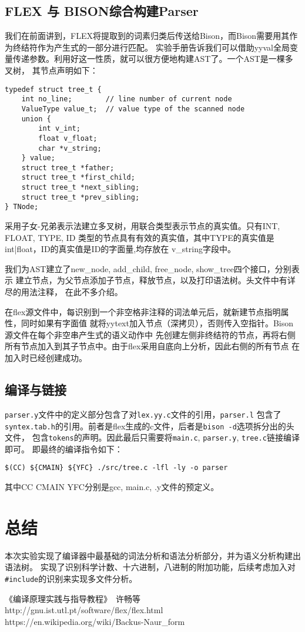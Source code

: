 \documentclass[twocolumn]{article}
\begin{document}
\subsection{FLEX 与 BISON综合构建Parser}
我们在前面讲到，FLEX将提取到的词素归类后传送给Bison，而Bison需要用其作为终结符作为产生式的一部分进行匹配。
实验手册告诉我们可以借助yyval全局变量传递参数。利用好这一性质，就可以很方便地构建AST了。一个AST是一棵多叉树，
其节点声明如下：
\begin{lstlisting}[style=style1]
typedef struct tree_t {
    int no_line;        // line number of current node
    ValueType value_t;  // value type of the scanned node
    union {
        int v_int;
        float v_float;
        char *v_string;
    } value;
    struct tree_t *father;
    struct tree_t *first_child;
    struct tree_t *next_sibling;
    struct tree_t *prev_sibling;
} TNode;

\end{lstlisting}

采用子女-兄弟表示法建立多叉树，用联合类型表示节点的真实值。只有INT, FLOAT, TYPE, ID
类型的节点具有有效的真实值，其中TYPE的真实值是int|float，ID的真实值是ID的字面量,均存放在
v\_string字段中。

我们为AST建立了new\_node, add\_child, free\_node, show\_tree四个接口，分别表示
建立节点，为父节点添加子节点，释放节点，以及打印语法树。头文件中有详尽的用法注释，
在此不多介绍。

在flex源文件中，每识别到一个非空格非注释的词法单元后，就新建节点指明属性，同时如果有字面值
就将yytext加入节点（深拷贝），否则传入空指针。Bison源文件在每个非空串产生式的语义动作中
先创建左侧非终结符的节点，再将右侧所有节点加入到其子节点中。由于flex采用自底向上分析，因此右侧的所有节点
在加入时已经创建成功。

\subsection{编译与链接}
\verb|parser.y|文件中的定义部分包含了对\verb|lex.yy.c|文件的引用，\verb|parser.l|
包含了\verb|syntex.tab.h|的引用。前者是flex生成的c文件，后者是\verb|bison -d|选项拆分出的头文件，
包含\verb|tokens|的声明。因此最后只需要将\verb|main.c|, \verb|parser.y|, \verb|tree.c|链接编译即可。
即最终的编译指令如下：
\begin{lstlisting}[style=style1]
$(CC) ${CMAIN} ${YFC} ./src/tree.c -lfl -ly -o parser
\end{lstlisting}
其中CC CMAIN YFC分别是gcc, main.c, .y文件的预定义。

\section{总结}
本次实验实现了编译器中最基础的词法分析和语法分析部分，并为语义分析构建出语法树。
实现了识别科学计数、十六进制，八进制的附加功能，后续考虑加入对\verb|#include|的识别来实现多文件分析。

\begin{thebibliography}{00}
    《编译原理实践与指导教程》\ 许畅等
    http://gnu.ist.utl.pt/software/flex/flex.html
    https://en.wikipedia.org/wiki/Backus-Naur\_form
\end{thebibliography}
\end{document}
